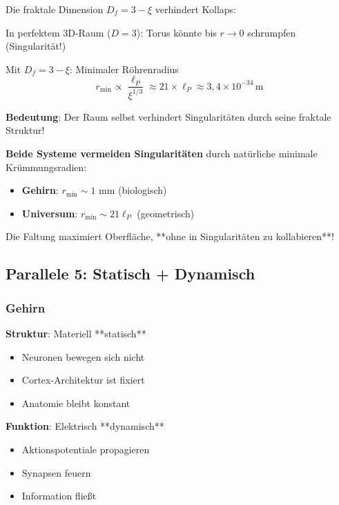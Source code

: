 	Die fraktale Dimension $D_f = 3 - \xi$ verhindert Kollaps:
	
	In perfektem 3D-Raum ($D=3$): Torus könnte bis $r \to 0$ schrumpfen (Singularität!)
	
	Mit $D_f = 3-\xi$: Minimaler Röhrenradius
	\begin{equation}
		r_{\min} \propto \frac{\ell_P}{\xi^{1/3}} \approx 21 \times \ell_P \approx 3,4 \times 10^{-34}\,\text{m}
	\end{equation}
	
	\textbf{Bedeutung}: Der Raum selbst verhindert Singularitäten durch seine fraktale Struktur!
	
	\begin{keyresult}
		\textbf{Beide Systeme vermeiden Singularitäten} durch natürliche minimale Krümmungsradien:
		
		\begin{itemize}
			\item \textbf{Gehirn}: $r_{\min} \sim 1$ mm (biologisch)
			\item \textbf{Universum}: $r_{\min} \sim 21 \ell_P$ (geometrisch)
		\end{itemize}
		
		Die Faltung maximiert Oberfläche, **ohne in Singularitäten zu kollabieren**!
	\end{keyresult}
	
	\subsection{Parallele 5: Statisch + Dynamisch}
	
	\subsubsection{Gehirn}
	
	\textbf{Struktur}: Materiell **statisch**
	\begin{itemize}
		\item Neuronen bewegen sich nicht
		\item Cortex-Architektur ist fixiert
		\item Anatomie bleibt konstant
	\end{itemize}
	
	\textbf{Funktion}: Elektrisch **dynamisch**
	\begin{itemize}
		\item Aktionspotentiale propagieren
		\item Synapsen feuern
		\item Information fließt
	\end{itemize}
	
